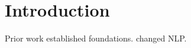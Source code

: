 \section{Introduction}
Prior work \cite{he2016deep} established foundations.
\cite{vaswani2017attention} changed NLP.
